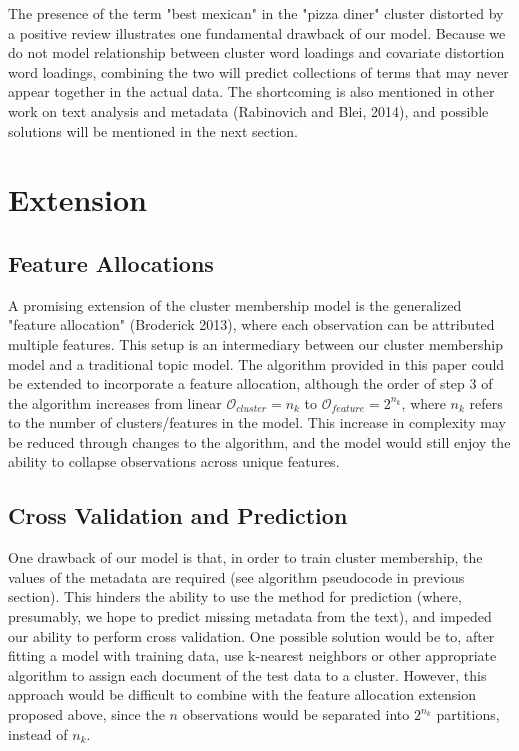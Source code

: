 \documentclass[12pt]{article}
\begin{document}
The presence of the term "best mexican" in the "pizza diner" cluster distorted by a positive review illustrates one fundamental drawback of our model. Because we do not model relationship between cluster word loadings and covariate distortion word loadings, combining the two will predict collections of terms that may never appear together in the actual data. The shortcoming is also mentioned in other work on text analysis and metadata (Rabinovich and Blei, 2014), and possible solutions will be mentioned in the next section.


\section{Extension}\label{extensions}

\subsection{Feature Allocations}
A promising extension of the cluster membership model is the generalized "feature allocation" (Broderick 2013), where each observation can be attributed multiple features. This setup is an intermediary between our cluster membership model and a traditional topic model. 
The algorithm provided in this paper could be extended to incorporate a feature allocation, although the order of step 3 of the algorithm increases from linear $\mathcal{O}_{cluster} = n_k$ to $\mathcal{O}_{feature} = 2^{n_k}$, where $n_k$ refers to the number of clusters/features in the model. This increase in complexity may be reduced through changes to the algorithm, and the model would still enjoy the ability to collapse observations across unique features. 

\subsection{Cross Validation and Prediction}
One drawback of our model is that, in order to train cluster membership, the values of the metadata are required (see algorithm pseudocode in previous section). This hinders the ability to use the method for prediction (where, presumably, we hope to predict missing metadata from the text), and impeded our ability to perform cross validation. One possible solution would be to, after fitting a model with training data, use k-nearest neighbors or other appropriate algorithm to assign each document of the test data to a cluster. However, this approach would be difficult to combine with the feature allocation extension proposed above, since the $n$ observations would be separated into $2^{n_k}$ partitions, instead of $n_k$. 
\end{document}
